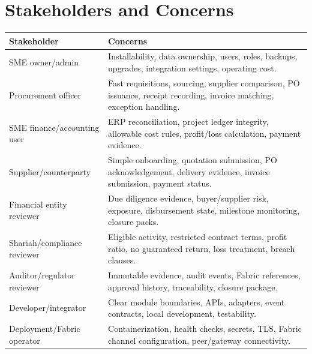 \documentclass[11pt,a4paper]{article}
\begin{document}
\section{Stakeholders and Concerns}
\begin{longtable}{L{42mm}L{94mm}}
\toprule
\textbf{Stakeholder} & \textbf{Concerns} \\
\midrule
SME owner/admin & Installability, data ownership, users, roles, backups, upgrades, integration settings, operating cost. \\
Procurement officer & Fast requisitions, sourcing, supplier comparison, PO issuance, receipt recording, invoice matching, exception handling. \\
SME finance/accounting user & ERP reconciliation, project ledger integrity, allowable cost rules, profit/loss calculation, payment evidence. \\
Supplier/counterparty & Simple onboarding, quotation submission, PO acknowledgement, delivery evidence, invoice submission, payment status. \\
Financial entity reviewer & Due diligence evidence, buyer/supplier risk, exposure, disbursement state, milestone monitoring, closure packs. \\
Shariah/compliance reviewer & Eligible activity, restricted contract terms, profit ratio, no guaranteed return, loss treatment, breach clauses. \\
Auditor/regulator reviewer & Immutable evidence, audit events, Fabric references, approval history, traceability, closure package. \\
Developer/integrator & Clear module boundaries, APIs, adapters, event contracts, local development, testability. \\
Deployment/Fabric operator & Containerization, health checks, secrets, TLS, Fabric channel configuration, peer/gateway connectivity. \\
\bottomrule
\end{longtable}
\end{document}

